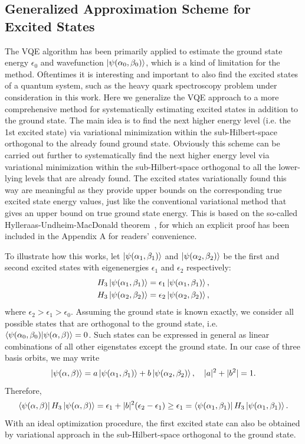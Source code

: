\documentclass[aps,10pt,superscriptaddress,floatfix,nofootinbib,notitlepage]{revtex4-1}
\begin{document}
\subsection{Generalized Approximation Scheme for Excited States}

The VQE algorithm has been primarily applied to estimate the ground state energy $\epsilon_0$ and wavefunction 
$\ket{\psi(\alpha_0,\beta_0)}$, which is a kind of limitation for the method. Oftentimes it is interesting and important to also find the excited states of a quantum system, such as the heavy quark spectroscopy problem under consideration in this work. 
Here we generalize the VQE approach to a more comprehensive method for systematically estimating excited states in addition to the ground state. The main idea is to find the next higher energy level (i.e. the 1st excited state) via variational minimization within the sub-Hilbert-space orthogonal to the already found ground state. Obviously this scheme can be carried out further to systematically find the next higher energy level via variational minimization within the sub-Hilbert-space orthogonal to all the lower-lying levels that are already found. The excited states variationally found this way are meaningful as they provide upper bounds on the corresponding true excited state energy values, just like the conventional variational method that gives an upper bound on true ground state energy.   This is based on the so-called Hylleraas-Undheim-MacDonald theorem~\cite{HU1930,PhysRev.43.830}, for which an explicit proof has been included in the Appendix A for readers' convenience.   


 To illustrate how this works, let $\ket{\psi(\alpha_1,\beta_1)}$ and $\ket{\psi(\alpha_2,\beta_2)}$ be the first and second excited states with eigenenergies $\epsilon_1$ and $\epsilon_2$ respectively: 
\begin{gather}
   H_3\ket{\psi(\alpha_1,\beta_1)}
    =\epsilon_1  \ket{\psi(\alpha_1,\beta_1)} , \\
  H_3\ket{\psi(\alpha_2,\beta_2)}
    =\epsilon_2   \ket{\psi(\alpha_2,\beta_2)} ,
\end{gather}
where $\epsilon_2>\epsilon_1>\epsilon_0$. Assuming the ground state is known exactly, we consider all possible states that are orthogonal to the ground state, i.e. 
 $\braket{\psi(\alpha_0,\beta_0)|\psi(\alpha,\beta)}=0$. Such states can be expressed in general as linear combinations of all other eigenstates except the ground state. In our case of three basis orbits, we may write 
\begin{equation}
    \ket{\psi(\alpha,\beta)}
    =a\ket{\psi(\alpha_1,\beta_1)}
    +b\ket{\psi(\alpha_2,\beta_2)},
    \quad
    |a|^2+|b^2|=1.
\end{equation}
Therefore,
\begin{equation}
    \bra{\psi(\alpha,\beta)}H_3\ket{\psi(\alpha,\beta)}
    =\epsilon_1
    +|b|^2(\epsilon_2-\epsilon_1)
    \geq
    \epsilon_1
    =\bra{\psi(\alpha_1,\beta_1)}H_3\ket{\psi(\alpha_1,\beta_1)}.
\end{equation}
With an ideal optimization procedure, the first excited state can also be obtained by variational approach in the sub-Hilbert-space orthogonal to the ground state. 
\end{document}
